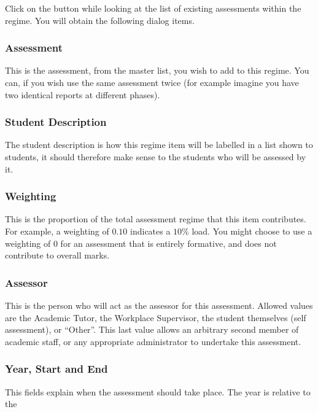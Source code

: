 \documentclass[12 pt]{book}
\begin{document}
Click on the  button while looking at the list of
existing assessments within the regime. You will obtain the following
dialog items.

\subsubsection{Assessment}

This is the assessment, from the master list, you wish to add to this 
regime. You can, if you wish use the same assessment twice (for example
imagine you have two identical reports at different phases).

\subsubsection{Student Description}

The student description is how this regime item will be labelled in a
list shown to students, it should therefore make sense to the students
who will be assessed by it.

\subsubsection{Weighting}

This is the proportion of the total assessment regime that this item
contributes. For example, a weighting of $0.10$ indicates a $10\%$ load.
You might choose to use a weighting of $0$ for an assessment that is
entirely formative, and does not contribute to overall marks.

\subsubsection{Assessor}

This is the person who will act as the assessor for this assessment.
Allowed values are the Academic Tutor, the Workplace Supervisor, the
student themselves (self assessment), or ``Other''. This last value
allows an arbitrary second member of academic staff, or any appropriate
administrator to undertake this assessment.

\subsubsection{Year, Start and End}

This fields explain when the assessment should take place. The year is
relative to the
\end{document}
